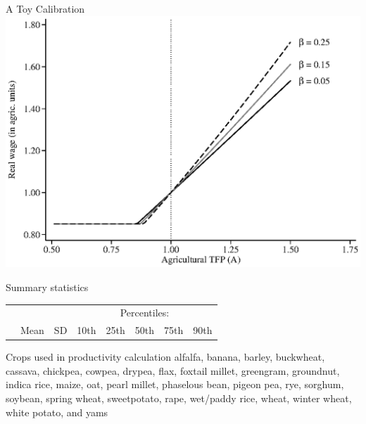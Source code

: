 \documentclass[10pt, xcolor=dvipsnames]{beamer}
\begin{document}
\begin{frame}{A Toy Calibration}
\includegraphics[width=.8\textwidth]{fig_sim_A_w.eps}
\end{frame}

\begin{frame}{Summary statistics}\label{stats}
\begin{tabularx}{\textwidth}{lXXXXXXX}
\midrule
 &      &            & \multicolumn{5}{c}{Percentiles:} \\ \cmidrule{4-8}
 & Mean & SD  & 10th    & 25th    & 50th & 75th & 90th \\
\midrule

\midrule
\end{tabularx}
\hfill \hyperlink{data}{}
\end{frame}

\begin{frame}{Crops used in productivity calculation}\label{crops}
alfalfa, banana, barley, buckwheat, cassava, chickpea, cowpea, drypea, flax, foxtail millet, greengram, groundnut, indica rice, maize, oat, pearl millet, phaselous bean, pigeon pea, rye, sorghum, soybean, spring wheat, sweetpotato, rape, wet/paddy rice, wheat, winter wheat, white potato, and yams

\hfill \hyperlink{data}{}
\end{frame}
\end{document}
